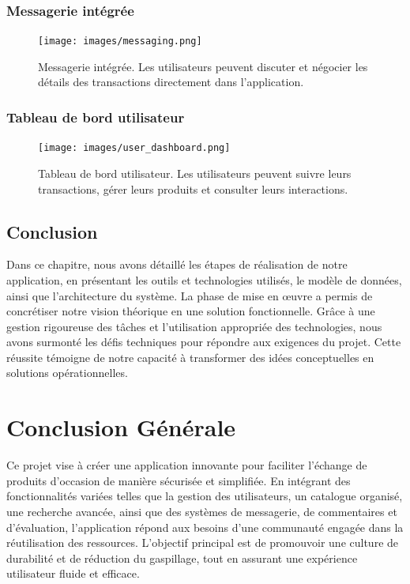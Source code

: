 \documentclass[12pt,a4paper]{report}
\begin{document}
	\subsection{Messagerie intégrée}
	\begin{figure}[H]
		\centering
		\texttt{[image: images/messaging.png]} %
		\caption{Messagerie intégrée. Les utilisateurs peuvent discuter et négocier les détails des transactions directement dans l'application.}
		\label{fig:messaging}
	\end{figure}
	
	\subsection{Tableau de bord utilisateur}
	\begin{figure}[H]
		\centering
		\texttt{[image: images/user\_dashboard.png]} %
		\caption{Tableau de bord utilisateur. Les utilisateurs peuvent suivre leurs transactions, gérer leurs produits et consulter leurs interactions.}
		\label{fig:user_dashboard}
	\end{figure}
	
	\section{Conclusion}
	Dans ce chapitre, nous avons détaillé les étapes de réalisation de notre application, en présentant les outils et technologies utilisés, le modèle de données, ainsi que l'architecture du système. La phase de mise en œuvre a permis de concrétiser notre vision théorique en une solution fonctionnelle. Grâce à une gestion rigoureuse des tâches et l'utilisation appropriée des technologies, nous avons surmonté les défis techniques pour répondre aux exigences du projet. Cette réussite témoigne de notre capacité à transformer des idées conceptuelles en solutions opérationnelles.
	
	
	\chapter*{Conclusion Générale}
	\newpage
	
	Ce projet vise à créer une application innovante pour faciliter l'échange de produits d'occasion de manière sécurisée et simplifiée. En intégrant des fonctionnalités variées telles que la gestion des utilisateurs, un catalogue organisé, une recherche avancée, ainsi que des systèmes de messagerie, de commentaires et d'évaluation, l'application répond aux besoins d'une communauté engagée dans la réutilisation des ressources. L'objectif principal est de promouvoir une culture de durabilité et de réduction du gaspillage, tout en assurant une expérience utilisateur fluide et efficace.
	
\end{document}
